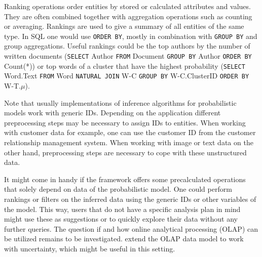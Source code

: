 Ranking operations order entities by stored or calculated attributes and values. They are often combined together with aggregation operations such as counting or averaging. Rankings are used to give a summary of all entities of the same type. In SQL one would use \texttt{ORDER BY}, mostly in combination with \texttt{GROUP BY} and group aggregations. Useful rankings could be the top authors by the number of written documents (\texttt{SELECT} Author \texttt{FROM} Document \texttt{GROUP BY} Author \texttt{ORDER BY} Count(*)) or top words of a cluster that have the highest probability (\texttt{SELECT} Word.Text \texttt{FROM} Word \texttt{NATURAL JOIN} W-C \texttt{GROUP BY} W-C.ClusterID \texttt{ORDER BY} W-T.$\mu$).

Note that usually implementations of inference algorithms for probabilistic models work with generic IDs. Depending on the application different preprocessing steps may be necessary to assign IDs to entities. When working with customer data for example, one can use the customer ID from the customer relationship management system. When working with image or text data on the other hand, preprocessing steps are necessary to cope with these unstructured data.

It might come in handy if the framework offers some precalculated operations that solely depend on data of the probabilistic model. One could perform rankings or filters on the inferred data using the generic IDs or other variables of the model. This way, users that do not have a specific analysis plan in mind might use these as suggestions or to quickly explore their data without any further queries. The question if and how online analytical processing (OLAP) can be utilized remains to be investigated. \textcite{burdick2007olap} extend the OLAP data model to work with uncertainty, which might be useful in this setting.
